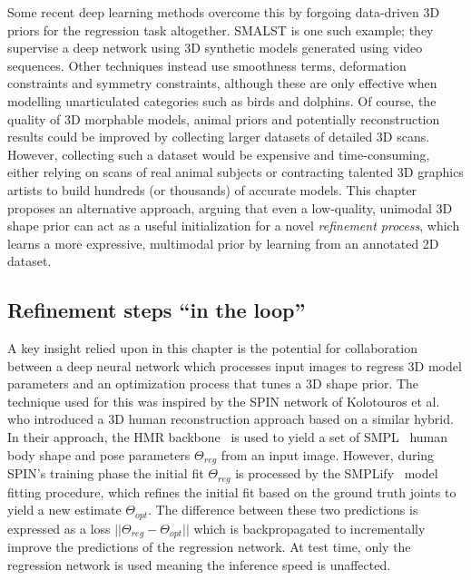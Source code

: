 Some recent deep learning methods overcome this by forgoing data-driven 3D priors for the regression task altogether. SMALST is one such example; they supervise a deep network using 3D synthetic models generated using video sequences. Other techniques  instead use smoothness terms, deformation constraints and symmetry constraints, although these are only effective when modelling unarticulated categories such as birds and dolphins. Of course, the quality of 3D morphable models, animal priors and potentially reconstruction results could be improved by collecting larger datasets of detailed 3D scans. However, collecting such a dataset would be expensive and time-consuming, either relying on scans of real animal subjects or contracting talented 3D graphics artists to build hundreds (or thousands) of accurate models. This chapter proposes an alternative approach, arguing that even a low-quality, unimodal 3D shape prior can act as a useful initialization for a novel \emph{refinement process}, which learns a more expressive, multimodal prior by learning from an annotated 2D dataset.

\subsection{Refinement steps ``in the loop''}

A key insight relied upon in this chapter is the potential for collaboration between a deep neural network which processes input images to regress 3D model parameters and an optimization process that tunes a 3D shape prior. The technique used for this was inspired by the SPIN network of Kolotouros et al.\lazycite{SPIN]{}} who introduced a 3D human reconstruction approach based on a similar hybrid. In their approach, the HMR backbone~ is used to yield a set of SMPL~ human body shape and pose parameters $\Theta_{reg}$ from an input image. However, during SPIN's training phase the initial fit $\Theta_{reg}$ is processed by the SMPLify~ model fitting procedure, which refines the initial fit based on the ground truth joints to yield a new estimate $\Theta_{opt}$. The difference between these two predictions is expressed as a loss $||\Theta_{reg} - \Theta_{opt}||$ which is backpropagated to incrementally improve the predictions of the regression network. At test time, only the regression network is used meaning the inference speed is unaffected. 

